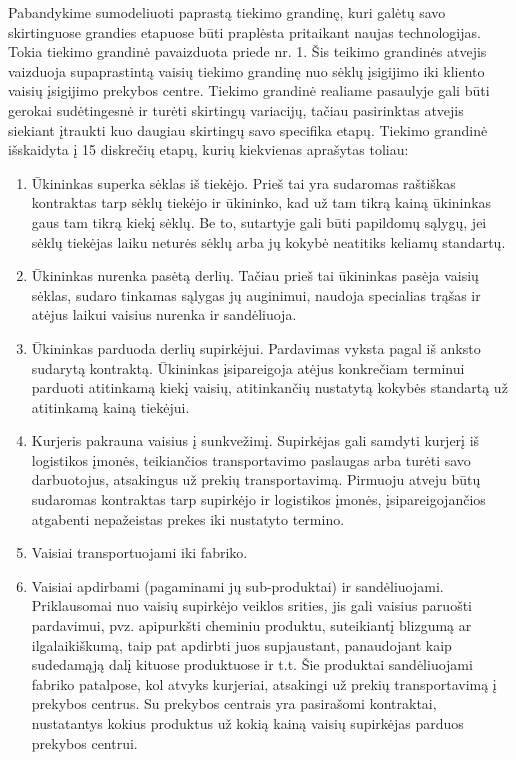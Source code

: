 Pabandykime sumodeliuoti paprastą tiekimo grandinę, kuri galėtų savo skirtinguose grandies etapuose būti praplėsta pritaikant naujas technologijas. Tokia tiekimo grandinė pavaizduota priede nr. 1. Šis teikimo grandinės atvejis vaizduoja supaprastintą vaisių tiekimo grandinę nuo sėklų įsigijimo iki kliento vaisių įsigijimo prekybos centre. Tiekimo grandinė realiame pasaulyje gali būti gerokai sudėtingesnė ir turėti skirtingų variacijų, tačiau pasirinktas atvejis siekiant įtraukti kuo daugiau skirtingų savo specifika etapų. Tiekimo grandinė išskaidyta į 15 diskrečių etapų, kurių kiekvienas aprašytas toliau:
\begin{enumerate}
    \item Ūkininkas superka sėklas iš tiekėjo. Prieš tai yra sudaromas raštiškas kontraktas tarp sėklų tiekėjo ir ūkininko, kad už tam tikrą kainą ūkininkas gaus tam tikrą kiekį sėklų. Be to, sutartyje gali būti papildomų sąlygų, jei sėklų tiekėjas laiku neturės sėklų arba jų kokybė neatitiks keliamų standartų.
    \item Ūkininkas nurenka pasėtą derlių. Tačiau prieš tai ūkininkas pasėja vaisių sėklas, sudaro tinkamas sąlygas jų auginimui, naudoja specialias trąšas ir atėjus laikui vaisius nurenka ir sandėliuoja.
    \item Ūkininkas parduoda derlių supirkėjui. Pardavimas vyksta pagal iš anksto sudarytą kontraktą. Ūkininkas įsipareigoja atėjus konkrečiam terminui parduoti atitinkamą kiekį vaisių, atitinkančių nustatytą kokybės standartą už atitinkamą kainą tiekėjui.
    \item Kurjeris pakrauna vaisius į sunkvežimį. Supirkėjas gali samdyti kurjerį iš logistikos įmonės, teikiančios transportavimo paslaugas arba turėti savo darbuotojus, atsakingus už prekių transportavimą. Pirmuoju atveju būtų sudaromas kontraktas tarp supirkėjo ir logistikos įmonės, įsipareigojančios atgabenti nepažeistas prekes iki nustatyto termino.
    \item Vaisiai transportuojami iki fabriko.
    \item Vaisiai apdirbami (pagaminami jų sub-produktai) ir sandėliuojami. Priklausomai nuo vaisių supirkėjo veiklos srities, jis gali vaisius paruošti pardavimui, pvz. apipurkšti cheminiu produktu, suteikiantį blizgumą ar ilgalaikiškumą, taip pat apdirbti juos supjaustant, panaudojant kaip sudedamąją dalį kituose produktuose ir t.t. Šie produktai sandėliuojami fabriko patalpose, kol atvyks kurjeriai, atsakingi už prekių transportavimą į prekybos centrus. Su prekybos centrais yra pasirašomi kontraktai, nustatantys kokius produktus už kokią kainą vaisių supirkėjas parduos prekybos centrui.

\end{enumerate}
